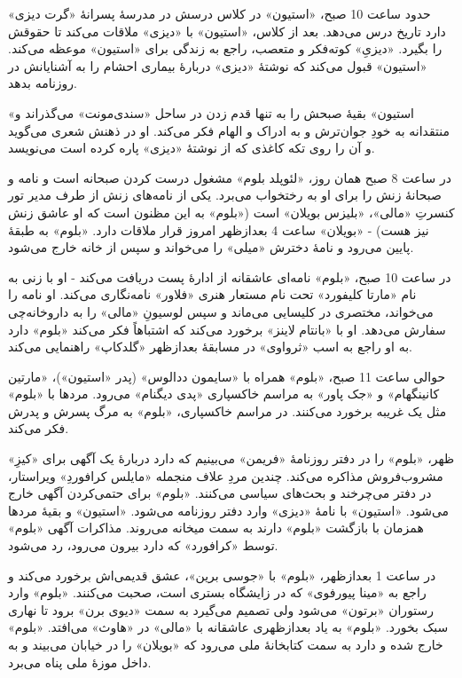 \documentclass[12pt]{book}
\newcommand{\noun}[1]{«{#1}»}
\begin{document}
    حدود ساعت 10 صبح، \noun{استیون} در کلاس درسش در مدرسۀ پسرانۀ \noun{گرت دیزی} دارد تاریخ درس می‌دهد. بعد از کلاس، \noun{استیون} با \noun{دیزی} ملاقات می‌کند تا حقوقش را بگیرد. \noun{دیزیِ} کوته‌فکر و متعصب، راجع به زندگی برای \noun{استیون} موعظه می‌کند. \noun{استیون} قبول می‌کند که نوشتۀ \noun{دیزی} دربارۀ بیماری احشام را به آشنایانش در روزنامه بدهد.

    \noun{استیون} بقیۀ صبحش را به تنها قدم زدن در ساحل \noun{سندی‌مونت} می‌گذراند و منتقدانه به خودِ جوان‌ترش و به ادراک و الهام فکر می‌کند. او در ذهنش شعری می‌گوید و آن را روی تکه کاغذی که از نوشتۀ \noun{دیزی} پاره کرده است می‌نویسد.

    در ساعت 8 صبح همان روز، \noun{لئوپلد بلوم} مشغول درست کردن صبحانه است و نامه و صبحانۀ زنش را برای او به رختخواب می‌برد. یکی از نامه‌های زنش از طرف مدیر تور کنسرتِ \noun{مالی}، \noun{بلیزس بویلان} است (\noun{بلوم} به این مظنون است که او عاشق زنش نیز هست) - \noun{بویلان} ساعت 4 بعدازظهر امروز قرار ملاقات دارد. \noun{بلوم} به طبقۀ پایین می‌رود و نامۀ دخترش \noun{میلی} را می‌خواند و سپس از خانه خارج می‌شود.

    در ساعت 10 صبح، \noun{بلوم} نامه‌ای عاشقانه از ادارۀ پست دریافت می‌کند - او با زنی به نام \noun{مارتا کلیفورد} تحت نام مستعار هنری \noun{فلاور} نامه‌نگاری می‌کند. او نامه را می‌خواند، مختصری در کلیسایی می‌ماند و سپس لوسیونِ \noun{مالی} را به داروخانه‌چی سفارش می‌دهد. او با \noun{بانتام لاینز} برخورد می‌کند که اشتباهاً فکر می‌کند \noun{بلوم} دارد به او راجع به اسب \noun{ثرواوی} در مسابقۀ بعدازظهر \noun{گلدکاپ} راهنمایی می‌کند.

    حوالی ساعت 11 صبح، \noun{بلوم} همراه با \noun{سایمون ددالوس} (پدر \noun{استیون})، \noun{مارتین کانینگهام} و \noun{جک پاور} به مراسم خاکسپاری \noun{پدی دیگنام} می‌رود. مردها با \noun{بلوم} مثل یک غریبه برخورد می‌کنند. در مراسم خاکسپاری، \noun{بلوم} به مرگ پسرش و پدرش فکر می‌کند.

    ظهر، \noun{بلوم} را در دفتر روزنامۀ \noun{فریمن} می‌بینیم که دارد دربارۀ یک آگهی برای \noun{کیزِ} مشروب‌فروش مذاکره می‌کند. چندین مردِ علاف منجمله \noun{مایلس کرافوردِ} ویراستار، در دفتر می‌چرخند و بحث‌های سیاسی می‌کنند. \noun{بلوم} برای حتمی‌کردن آگهی خارج می‌شود. \noun{استیون} با نامۀ \noun{دیزی} وارد دفتر روزنامه می‌شود. \noun{استیون} و بقیۀ مردها همزمان با بازگشت \noun{بلوم} دارند به سمت میخانه می‌روند. مذاکرات آگهی \noun{بلوم} توسط \noun{کرافورد} که دارد بیرون می‌رود، رد می‌شود.

    در ساعت 1 بعدازظهر، \noun{بلوم} با \noun{جوسی برین}، عشق قدیمی‌اش برخورد می‌کند و راجع به \noun{مینا پیورفوی} که در زایشگاه بستری است، صحبت می‌کنند. \noun{بلوم} وارد رستوران \noun{برتون} می‌شود ولی تصمیم می‌گیرد به سمت \noun{دیوی برن} برود تا نهاری سبک بخورد. \noun{بلوم} به یاد بعدازظهری عاشقانه با \noun{مالی} در \noun{هاوث} می‌افتد. \noun{بلوم} خارج شده و دارد به سمت کتابخانۀ ملی می‌رود که \noun{بویلان} را در خیابان می‌بیند و به داخل موزۀ ملی پناه می‌برد.
\end{document}
